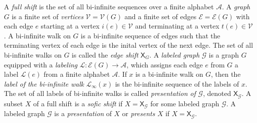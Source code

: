 \documentclass{article}
\newcommand{\Ac}{\mathcal{A}}  %
\newcommand{\Lc}{\mathcal{L}}  %
\newcommand{\Gc}{\mathcal{G}}  %
\newcommand{\Vc}{\mathcal{V}}
\newcommand{\Ec}{\mathcal{E}}
\newcommand{\shift}[1]{\mathsf{X}_{#1}}
\newcommand{\term}[1]{\textit{#1}}
\begin{document}

A \term{full shift} is the set of all bi-infinite sequences over a finite alphabet \(\Ac\).
A \term{graph} \(G\) is a finite set of \term{vertices} \(\Vc=\Vc(G)\) and a finite set 
of edges \(\Ec = \Ec(G)\) with each edge \(e\) starting at a vertex \(i(e) \in \Vc\)
and terminating at a vertex \(t(e) \in \Vc\). 
A bi-infinite walk on \(G\) is a bi-infinite sequence of edges such that the 
terminating vertex of each edge is the inital vertex of the next edge. The set of 
all bi-infinite walks on \(G\) is called the \term{edge shift} \(\shift{G}\).
A \term{labeled graph} \(\Gc\)
is a graph \(G\) equipped with a \term{labeling} \(\Lc: \Ec(G) \to \Ac\), which assigns each
edge \(e\) from \(G\) a label \(\Lc(e)\) from a finite alphabet \(\Ac\). If \(x\) is 
a bi-infinite walk on \(G\), then the \term{label of the bi-infinite walk} \(\Lc_\infty(x)\) is 
the bi-infinite sequence of the labels of \(x\). The set of all labels of bi-infinite 
walks is called \term{presentation of \(\Gc\)}, denoted \(\shift{\Gc}\). A subset \(X\) of a full shift is a \term{sofic shift} if \(X = \shift{\Gc}\)
for some labeled graph \(\Gc\). A labeled graph \(\Gc\) is a \term{presentation} 
of \(X\) or \term{presents \(X\)} if \(X=\shift{\Gc}\).
\end{document}
